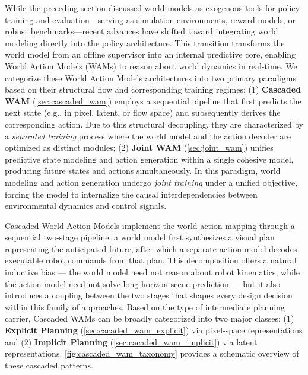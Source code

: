 \label{sec:arch}



While the preceding section discussed world models as exogenous tools for policy training and evaluation—serving as simulation environments, reward models, or robust benchmarks—recent advances have shifted toward integrating world modeling directly into the policy architecture. This transition transforms the world model from an offline supervisor into an internal predictive core, enabling World Action Models (WAMs) to reason about world dynamics in real-time. 
We categorize these World Action Models architectures into two primary paradigms based on their structural flow and corresponding training regimes: (1) \textbf{Cascaded WAM} (\autoref{sec:cascaded_wam}) employs a sequential pipeline that first predicts the next state (e.g., in pixel, latent, or flow space) and subsequently derives the corresponding action. Due to this structural decoupling, they are characterized by a \textit{separated training} process where the world model and the action decoder are optimized as distinct modules; (2) \textbf{Joint WAM} (\autoref{sec:joint_wam}) unifies predictive state modeling and action generation within a single cohesive model, producing future states and actions simultaneously. In this paradigm, world modeling and action generation undergo \textit{joint training} under a unified objective, forcing the model to internalize the causal interdependencies between environmental dynamics and control signals.




Cascaded World-Action-Models implement the world-action mapping through a sequential two-stage pipeline: a world model first synthesizes a visual plan representing the anticipated future, after which a separate action model decodes executable robot commands from that plan. This decomposition offers a natural inductive bias — the world model need not reason about robot kinematics, while the action model need not solve long-horizon scene prediction — but it also introduces a coupling between the two stages that shapes every design decision within this family of approaches. Based on the type of intermediate planning carrier, Cascaded WAMs can be broadly categorized into two major classes: (1) \textbf{Explicit Planning} (\autoref{sec:cacaded_wam_explicit}) via pixel-space representations and (2) \textbf{Implicit Planning} (\autoref{sec:cacaded_wam_implicit}) via latent representations. \autoref{fig:cascaded_wam_taxonomy}  provides a schematic overview of these cascaded patterns.

